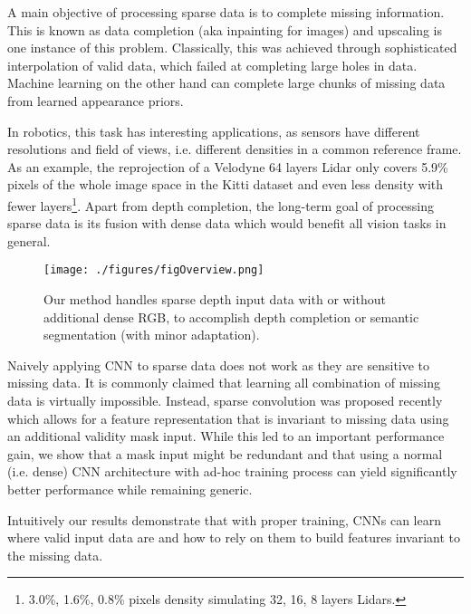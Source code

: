 \documentclass[10pt,twocolumn,letterpaper]{article}
\begin{document}
A main objective of processing sparse data is to complete missing information. This is known as data completion (aka inpainting for images) and upscaling is one instance of this problem. 
Classically, this was achieved through sophisticated interpolation of valid data, which failed at completing large holes in data.
Machine learning on the other hand can complete large chunks of missing data from learned appearance priors. 

In robotics, this task has interesting applications, as sensors have different resolutions and field of views, i.e. different densities in a common reference frame. As an example,
the reprojection of a Velodyne 64 layers Lidar only covers 5.9\% pixels of the whole image space in the Kitti dataset and even less density with fewer layers\footnote{3.0\%, 1.6\%, 0.8\% pixels density simulating 32, 16, 8 layers Lidars.}.
Apart from depth completion, the long-term goal of processing sparse data is its fusion with dense data which would benefit all vision tasks in general.








\begin{figure}
	\centering
	\texttt{[image: ./figures/figOverview.png]}
	\caption{Our method handles sparse depth input data with or without additional dense RGB, to accomplish depth completion or semantic segmentation (with minor adaptation).}
	\label{fig:scheme}
\end{figure}

Naively applying CNN to sparse data does not work as they are sensitive to missing data.
It is commonly claimed that learning all combination of missing data is virtually impossible.
Instead, sparse convolution \cite{uhrig2017sparsity, ren2018SBNet} was proposed recently which allows for a feature representation that is invariant
to missing data using an additional validity mask input.
While this led to an important performance gain, we show that a mask input might be redundant and that using a normal (i.e. dense) CNN architecture
with ad-hoc training process can yield significantly better performance while remaining generic.

Intuitively our results demonstrate that with proper training, CNNs can learn where valid input data are and how to rely on them to build features invariant to the missing data.
\end{document}
